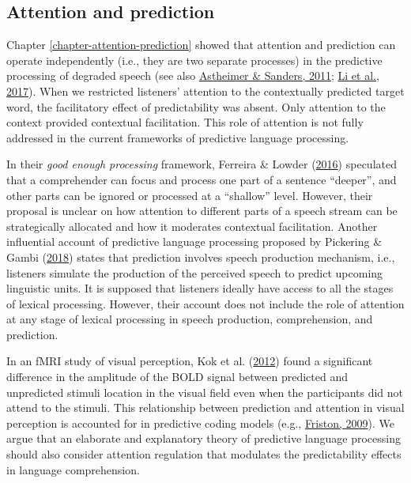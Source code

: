 \documentclass[a4paper, nobind]{templates/ociamthesis}
\begin{document}
\hypertarget{attention-and-prediction}{%
\subsection{Attention and prediction}\label{attention-and-prediction}}

Chapter \ref{chapter-attention-prediction} showed that attention and prediction can operate independently (i.e., they are two separate processes) in the predictive processing of degraded speech (see also \protect\hyperlink{ref-Astheimer2011}{Astheimer \& Sanders, 2011}; \protect\hyperlink{ref-Li2017}{Li et al., 2017}).
When we restricted listeners' attention to the contextually predicted target word, the facilitatory effect of predictability was absent.
Only attention to the context provided contextual facilitation.
This role of attention is not fully addressed in the current frameworks of predictive language processing.

In their \emph{good enough processing} framework, Ferreira \& Lowder (\protect\hyperlink{ref-Ferreira2016}{2016}) speculated that a comprehender can focus and process one part of a sentence ``deeper'',
and other parts can be ignored or processed at a ``shallow'' level.
However, their proposal is unclear on how attention to different parts of a speech stream can be strategically allocated
and how it moderates contextual facilitation.
Another influential account of predictive language processing proposed by Pickering \& Gambi (\protect\hyperlink{ref-Pickering2018}{2018}) states that prediction involves speech production mechanism,
i.e., listeners simulate the production of the perceived speech to predict upcoming linguistic units.
It is supposed that listeners ideally have access to all the stages of lexical processing.
However, their account does not include the role of attention at any stage of lexical processing in speech production, comprehension, and prediction.

In an fMRI study of visual perception, Kok et al. (\protect\hyperlink{ref-Kok2012}{2012}) found a significant difference in the amplitude of the BOLD signal between predicted and unpredicted stimuli location in the visual field even when the participants did not attend to the stimuli.
This relationship between prediction and attention in visual perception is accounted for in predictive coding models (e.g., \protect\hyperlink{ref-Friston2009}{Friston, 2009}).
We argue that an elaborate and explanatory theory of predictive language processing should also consider attention regulation that modulates the predictability effects in language comprehension.
\end{document}
